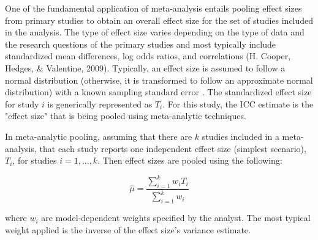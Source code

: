One of the fundamental application of meta-analysis entails pooling effect sizes from primary studies to obtain an overall effect size for the set of studies included in the analysis. The type of effect size varies depending on the type of data and the research questions of the primary studies and most typically include standardized mean differences, log odds ratios, and correlations (H. Cooper, Hedges, \& Valentine,
2009). Typically, an effect size is assumed to follow a normal distribution (otherwise, it is transformed to follow an approximate normal distribution) with a known sampling standard error \cite{hedgesWhatAreEffect2008}. The standardized effect size for study $i$ is generically represented as $T_i$. For this study, the ICC estimate is the "effect size" that is being pooled using meta-analytic techniques. 

In meta-analytic pooling, assuming that there are $k$ studies included in a meta-analysis, that each study reports one independent effect size (simplest scenario), $T_i$, for studies $i= 1,...,k$. Then effect sizes are pooled using the following:

\begin{equation}\label{fixed_pool}
\hat{\mu} = \frac{\sum_{i=1}^k w_iT_i}{\sum_{i=1}^k w_i}
\end{equation}

\noindent where $w_i$ are model-dependent weights specified by the analyst. The most typical weight applied is the inverse of the effect size's variance estimate. 





